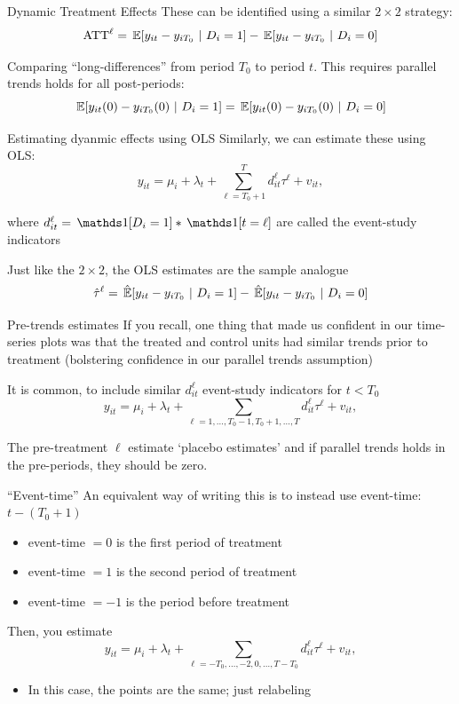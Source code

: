 \documentclass[aspectratio=169,t,11pt,table]{beamer}
\begin{document}
\begin{frame}{Dynamic Treatment Effects}
  These can be identified using a similar $2 \times 2$ strategy:
  $$
    \text{ATT}^\ell = \expec{y_{it} - y_{iT_0}}{D_i = 1} - \expec{y_{it} - y_{iT_0}}{D_i = 0}
  $$

  \bigskip
  Comparing ``long-differences'' from period $T_0$ to period $t$. This requires parallel trends holds for all post-periods:
  $$
    \expec{y_{it}(0) - y_{iT_0}(0)}{D_i = 1} = \expec{y_{it}(0) - y_{iT_0}(0)}{D_i = 0}
  $$
\end{frame}

\begin{frame}{Estimating dyanmic effects using OLS}
  Similarly, we can estimate these using OLS:
  $$
    y_{it} = \mu_i + \lambda_t + \sum_{\ell = T_0 + 1}^T d_{it}^\ell \tau^\ell + v_{it},
  $$
  
  where $d_{it}^\ell = \one{D_i = 1} * \one{t = \ell}$ are called the \alert{event-study indicators}

  \bigskip
  Just like the $2 \times 2$, the OLS estimates are the sample analogue 
  $$
    \hat{\tau}^{\ell} = \expechat{y_{it} - y_{iT_0}}{D_i = 1} - \expechat{y_{it} - y_{iT_0}}{D_i = 0}
  $$ 
\end{frame}

\begin{frame}{Pre-trends estimates}
  If you recall, one thing that made us confident in our time-series plots was that the treated and control units had similar trends prior to treatment (bolstering confidence in our parallel trends assumption)

  \pause
  \bigskip
  It is common, to include similar $d_{it}^\ell$ event-study indicators for $t < T_0$
  $$
    y_{it} = \mu_i + \lambda_t + \sum_{\ell = 1, \dots, T_0 - 1, T_0 + 1, \dots, T} d_{it}^\ell \tau^\ell + v_{it},
  $$
  
  The pre-treatment $\ell$ estimate `placebo estimates' and if parallel trends holds in the pre-periods, they should be zero.
\end{frame}

\begin{frame}{``Event-time''}
  An equivalent way of writing this is to instead use event-time: $t - (T_0 + 1)$
  \begin{itemize}
    \item event-time $= 0$ is the first period of treatment
    \item event-time $= 1$ is the second period of treatment
    \item event-time $= -1$ is the period before treatment
  \end{itemize}

  \bigskip
  Then, you estimate 
  $$
    y_{it} = \mu_i + \lambda_t + \sum_{\ell = -T_0, \dots, -2, 0, \dots, T - T_0} d_{it}^\ell \tau^\ell + v_{it},
  $$
  
  \begin{itemize}
    \item In this case, the points are the same; just relabeling
  \end{itemize}
\end{frame}
\end{document}
